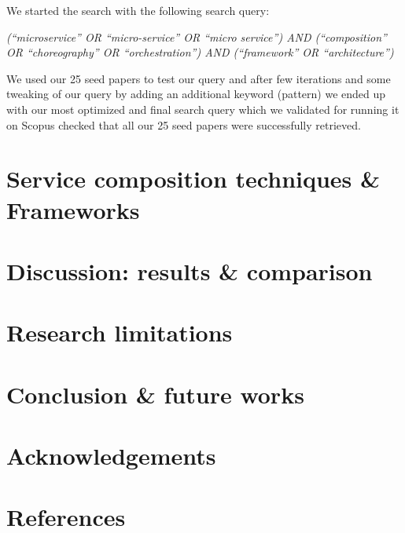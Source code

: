 \documentclass{article}
\begin{document}
We started the search with the following search query: 

\emph{(“microservice” OR “micro-service” OR “micro service”) AND (“composition” OR “choreography” OR “orchestration”) AND (“framework” OR “architecture”)}

We used our 25 seed papers to test our query and after few iterations and some tweaking of our query by adding an additional keyword (pattern) we ended up with our most optimized and final search query which we validated for running it on Scopus checked that all our 25 seed papers were successfully retrieved.




\section{Service composition techniques \& Frameworks}

\section{Discussion: results \& comparison}

\section{Research limitations}

\section{Conclusion \& future works}

\section{Acknowledgements}

\pagebreak 
\section{References}
\end{document}
